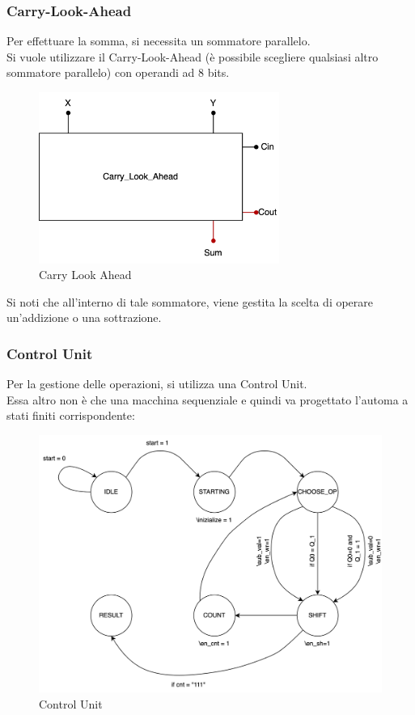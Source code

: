 \subsubsection{Carry-Look-Ahead}
Per effettuare la somma, si necessita un sommatore parallelo.\\ 
Si vuole utilizzare il Carry-Look-Ahead (è possibile scegliere qualsiasi altro sommatore parallelo) con operandi ad 8 bits. 

\begin{figure}[H]
	\centering
	\includegraphics[width=0.7\textwidth]{img/Esercizio_7_1/carry_look_ahead_beh}
	\caption{Carry Look Ahead}
	\label{CLA} 
\end{figure}

Si noti che all'interno di tale sommatore, viene gestita la scelta di operare un'addizione o una sottrazione.

\subsubsection{Control Unit}
Per la gestione delle operazioni, si utilizza una Control Unit.\\
Essa altro non è che una macchina sequenziale e quindi va progettato l'automa a stati finiti corrispondente:

\begin{figure}[H]
	\centering
	\includegraphics[width=1\textwidth]{img/Esercizio_7_1/booth_cu.png}
	\caption{Control Unit}
	\label{cu_automa} 
\end{figure}



